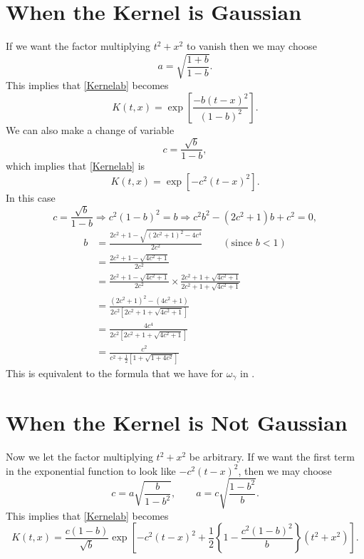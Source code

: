 \documentclass[]{elsarticle}
\theoremstyle{definition}
\begin{document}
\section{When the Kernel is Gaussian}
If we want the factor multiplying $t^2+x^2$ to vanish then we may choose
\[
a = \sqrt{\frac{1+b}{1-b}}.
\]
This implies that \eqref{Kernelab} becomes
\begin{equation}
K(t,x)  = \exp\left[\frac{-b(t-x)^2}{(1-b)^2} \right]
\label{KernelGaussb}.
\end{equation}
We can also make a change of variable
\[
c = \frac{\sqrt{b}}{1-b},
\]
which implies that \eqref{Kernelab} is
\begin{equation}
K(t,x)  = \exp\left[-c^2(t-x)^2 \right]
\label{KernelGaussc}.
\end{equation}
In this case
\begin{equation*}
c = \frac{\sqrt{b}} {1-b} \Longrightarrow c^2(1-b)^2=b \Longrightarrow c^2 b^2 - (2 c^2 +1) b + c^2 = 0,
\end{equation*}
\begin{align}
\nonumber
b &= \frac{2 c^2 + 1 - \sqrt{(2c^2+1)^2 - 4c^4}}{2c^2} \qquad (\text{since } b<1)\\
\nonumber
&= \frac{2 c^2 + 1 - \sqrt{4c^2+1}}{2c^2}\\
\nonumber
&= \frac{2 c^2 + 1 - \sqrt{4c^2+1}}{2c^2} \times \frac{2 c^2 + 1 + \sqrt{4c^2+1}}{2 c^2 + 1 + \sqrt{4c^2+1}} \\
\nonumber
&= \frac{(2 c^2 + 1)^2 - (4c^2+1)}{2c^2[2 c^2 + 1 + \sqrt{4c^2+1}]} \\
\nonumber
&= \frac{4 c^4}{2c^2[2 c^2 + 1 + \sqrt{4c^2+1}]} \\
&= \frac{c^2}{c^2 + \frac{1}{2}[1 + \sqrt{1+4c^2}]} \label{eigc}
\end{align}
This is equivalent to the formula that we have for $\omega_{\gamma}$ in \cite[(3.1)]{FasHicWoz12a}.

\section{When the Kernel is Not Gaussian}
Now we let the factor multiplying $t^2+x^2$ be arbitrary.  If we want the first term in the exponential function to look like $-c^2(t-x)^2$, then we may choose
\[
c = a\sqrt{\frac{b}{1-b^2}}, \qquad a = c\sqrt{\frac{1-b^2}{b}}.
\]
This implies that \eqref{Kernelab} becomes
\begin{equation}
K(t,x)  = \frac{c(1-b)}{\sqrt{b}} \exp\left[-c^2(t-x)^2 +\frac12\left\{1 - \frac{c^2(1-b)^2}{b} \right\} (t^2+x^2) \right] \label{Kernelbc}.
\end{equation}


\end{document}
